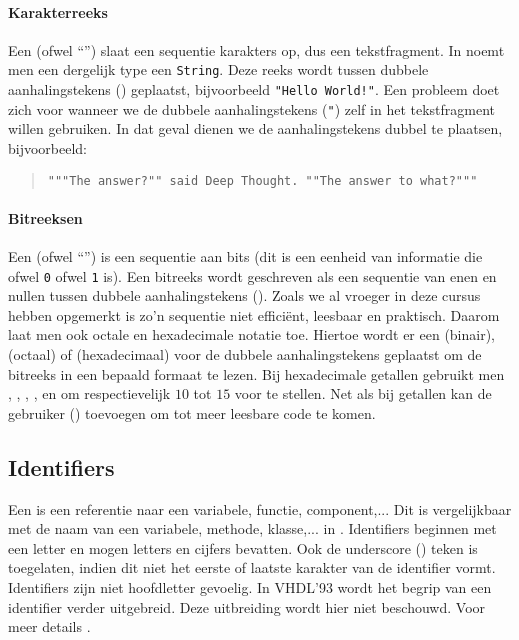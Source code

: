\paragraph{Karakterreeks}
Een  (ofwel ``'') slaat een sequentie karakters op, dus een tekstfragment. In \tjava{} noemt men een dergelijk type een \texttt{String}. Deze reeks wordt tussen dubbele aanhalingstekens () geplaatst, bijvoorbeeld \texttt{"Hello World!"}. Een probleem doet zich voor wanneer we de dubbele aanhalingstekens (\texttt{"}) zelf in het tekstfragment willen gebruiken. In dat geval dienen we de aanhalingstekens dubbel te plaatsen, bijvoorbeeld:
\begin{quote}\verb+"""The answer?"" said Deep Thought. ""The answer to what?"""+\cite[\S25]{Adams81BOOK54}\end{quote}

\paragraph{Bitreeksen}
Een  (ofwel ``'') is een sequentie aan bits (dit is een eenheid van informatie die ofwel \texttt{0} ofwel \texttt{1} is). Een bitreeks wordt geschreven als een sequentie van enen en nullen tussen dubbele aanhalingstekens (). Zoals we al vroeger in deze cursus hebben opgemerkt is zo'n sequentie niet effici\"ent, leesbaar en praktisch. Daarom laat men ook octale  en hexadecimale notatie toe. Hiertoe wordt er een  (binair),  (octaal) of  (hexadecimaal) voor de dubbele aanhalingstekens geplaatst om de bitreeks in een bepaald formaat te lezen. Bij hexadecimale getallen gebruikt men , , , ,  en  om respectievelijk $10$ tot $15$ voor te stellen. Net als bij getallen kan de gebruiker  (\vhdltermen{\_}) toevoegen om tot meer leesbare code te komen.

\subsection{Identifiers}
Een  is een referentie naar een variabele, functie, component,... Dit is vergelijkbaar met de naam van een variabele, methode, klasse,... in \tjava{}. Identifiers beginnen met een letter en mogen letters en cijfers bevatten. Ook de underscore (\vhdltermen{\_}) teken is toegelaten, indien dit niet het eerste of laatste karakter van de identifier vormt. Identifiers zijn niet hoofdletter gevoelig. In VHDL'93 wordt het begrip van een identifier verder uitgebreid. Deze uitbreiding wordt hier niet beschouwd. Voor meer details \cite[p. 4]{hardi00}.

